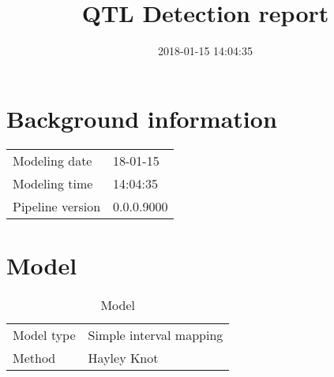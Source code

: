 \documentclass[a4paper,11pt]{article}\usepackage[]{graphicx}\usepackage[]{color}
\title{QTL Detection report}%
\author{\vspace{-5ex}}
\date{2018-01-15 14:04:35}
\begin{document}


\maketitle
\singlespacing

\section{Background information}
\begin{table}[ht]
\begin{flushleft}
\begin{tabular}{ll}
  Modeling date & 18-01-15 \\ 
  Modeling time & 14:04:35 \\ 
  Pipeline version & 0.0.0.9000 \\ 
  \end{tabular}
\label{background}
\end{flushleft}
\end{table}

\section{Model}
\begin{table}[ht]
\begin{flushleft}
\caption{Model} 
\label{model}
\begin{tabular}{ll}
  Model type & Simple interval mapping \\ 
  Method & Hayley Knot \\ 
  \end{tabular}
\end{flushleft}
\end{table}

\end{document}
